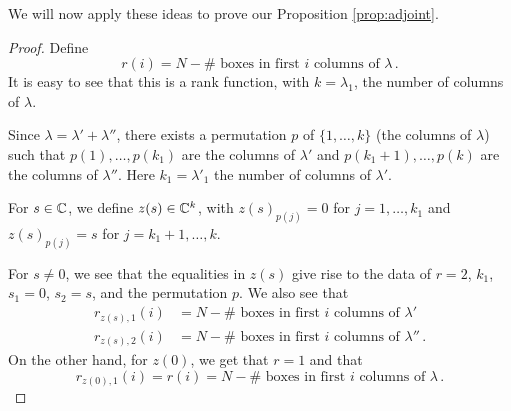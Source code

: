 \documentclass[draft]{article}
\begin{document}
We will now apply these ideas to prove our Proposition \ref{prop:adjoint}.

\begin{proof}


Define 
$$r(i) = N - \#\text{~boxes in first $i$ columns of }\lambda\,.$$
It is easy to see that this is a rank function, with $ k = \lambda_1$, the number of columns of $ \lambda$.

Since $\lambda = \lambda' + \lambda''$, there exists a permutation $ p $ of $ \{1, \dots, k\}$ (the columns of $ \lambda$) such that $ p(1), \dots, p(k_1) $ are the columns of $ \lambda'$ and $ p(k_1+1), \dots, p(k)$ are the columns of $ \lambda''$. Here $ k_1 = \lambda'_1$ the number of columns of $ \lambda'$.

For $ s \in \mathbb C$, we define $ z(s) \in \mathbb C^k$, with $ z(s)_{p(j)} = 0 $ for $ j = 1, \dots, k_1 $ and $ z(s)_{p(j)} = s $ for $ j = k_1 + 1, \dots, k$.

For $ s \ne 0$, we see that the equalities in $ z(s) $ give rise to the data of $ r = 2$, $k_1$, $s_1 = 0$, $s_2 = s$, and the permutation $p $.  We also see that
\begin{equation} 
    \label{eq:rcols}
\begin{split}
        r_{z(s), 1}(i) &=  N - \#\text{~boxes in first $i$ columns of }\lambda' \\
        r_{z(s), 2}(i) &=  N - \#\text{~boxes in first $i$ columns of }\lambda'' \,. 
\end{split}
\end{equation}
On the other hand, for $z(0)$, we get that $ r = 1$ and that 
\begin{equation} \label{eq:rcol2}
r_{z(0),1}(i) = r(i) = 
 N - 
     \#\text{~boxes in first $i$ columns of }\lambda\,. 
\end{equation}


\end{proof}
\end{document}
